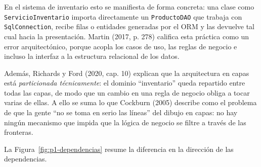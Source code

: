 \documentclass[11pt,a4paper]{article}
\begin{document}
En el sistema de inventario esto se manifiesta de forma concreta: una clase como \texttt{ServicioInventario} importa directamente un \texttt{ProductoDAO} que trabaja con \texttt{SqlConnection}, recibe filas o entidades generadas por el ORM y las devuelve tal cual hacia la presentación. Martin (2017, p. 278) califica esta práctica como un error arquitectónico, porque acopla los casos de uso, las reglas de negocio e incluso la interfaz a la estructura relacional de los datos.

Además, Richards y Ford (2020, cap. 10) explican que la arquitectura en capas está \emph{particionada técnicamente}: el dominio ``inventario'' queda repartido entre todas las capas, de modo que un cambio en una regla de negocio obliga a tocar varias de ellas. A ello se suma lo que Cockburn (2005) describe como el problema de que la gente ``no se toma en serio las líneas'' del dibujo en capas: no hay ningún mecanismo que impida que la lógica de negocio se filtre a través de las fronteras.

La Figura~\ref{fig:p1-dependencias} resume la diferencia en la dirección de las dependencias.
\end{document}
